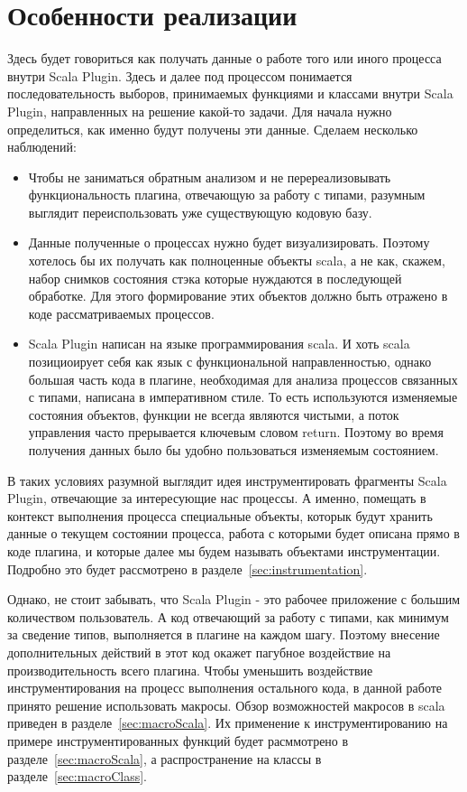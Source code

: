 \section{Особенности реализации}
Здесь будет говориться как получать данные о работе того или иного процесса
внутри Scala Plugin.
Здесь и далее под процессом понимается последовательность выборов, принимаемых функциями и
классами внутри Scala Plugin, направленных на решение какой-то задачи.
Для начала нужно определиться, как именно будут получены эти данные.
Сделаем несколько наблюдений:

\begin{itemize}
  \item Чтобы не заниматься обратным анализом и не перереализовывать функциональность плагина,
  отвечающую за работу с типами, разумным выглядит переиспользовать уже существующую кодовую базу.
  \item Данные полученные о процессах нужно будет визуализировать.
  Поэтому хотелось бы их получать как полноценные объекты scala, а не как, скажем,
  набор снимков состояния стэка которые нуждаются в последующей обработке.
  Для этого формирование этих объектов должно быть отражено в коде рассматриваемых процессов.
  \item Scala Plugin написан на языке программирования scala.
  И хоть scala позициоирует себя как язык с функциональной направленностью,
  однако большая часть кода в плагине, необходимая для анализа процессов связанных с типами,
  написана в императивном стиле.
  То есть используются изменяемые состояния объектов, функции не всегда являются чистыми,
  а поток управления часто прерывается ключевым словом return.
  Поэтому во время получения данных было бы удобно пользоваться изменяемым состоянием.
\end{itemize}

В таких условиях разумной выглядит идея инструментировать фрагменты Scala Plugin,
отвечающие за интересующие нас процессы.
А именно, помещать в контекст выполнения процесса специальные объекты,
которык будут хранить данные о текущем состоянии процесса,
работа с которыми будет описана прямо в коде плагина, и которые
далее мы будем называть объектами инструментации.
Подробно это будет рассмотрено в разделе~\ref{sec:instrumentation}.

Однако, не стоит забывать, что Scala Plugin - это рабочее приложение
с большим количеством пользователь.
А код отвечающий за работу с типами, как минимум за сведение типов,
выполняется в плагине на каждом шагу.
Поэтому внесение дополнительных действий в этот код окажет пагубное воздействие
на производительность всего плагина.
Чтобы уменьшить воздействие инструментирования на процесс выполнения остального кода,
в данной работе принято решение использовать макросы.
Обзор возможностей макросов в scala приведен в разделе~\ref{sec:macroScala}.
Их применение к инструментированию на примере инструментированных функций
будет расммотрено в разделе~\ref{sec:macroScala}, а распространение на классы
в разделе~\ref{sec:macroClass}.

